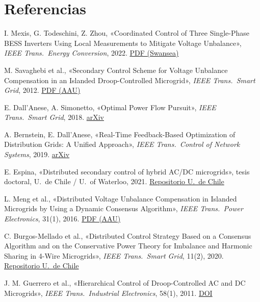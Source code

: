 \documentclass[10pt,a4paper]{article}
\begin{document}
\section{Referencias}
\begin{enumerate}[label={[\arabic*]},leftmargin=*,itemsep=2pt]
  \small
  \item I. Mexis, G. Todeschini, Z. Zhou, «Coordinated Control of Three Single-Phase BESS Inverters Using Local Measurements to Mitigate Voltage Unbalance», \emph{IEEE Trans.\ Energy Conversion}, 2022. \href{https://cronfa.swansea.ac.uk/Record/cronfa61052/Download/61052__25368__35dfd823984a46369995096bae02a94a.pdf}{PDF (Swansea)}
  \item M. Savaghebi et al., «Secondary Control Scheme for Voltage Unbalance Compensation in an Islanded Droop-Controlled Microgrid», \emph{IEEE Trans.\ Smart Grid}, 2012. \href{https://vbn.aau.dk/ws/files/61862782/PREPRINT_secondary_control_scheme_for_voltage_unbalance_compensation.pdf}{PDF (AAU)}
  \item E. Dall'Anese, A. Simonetto, «Optimal Power Flow Pursuit», \emph{IEEE Trans.\ Smart Grid}, 2018. \href{https://arxiv.org/abs/1601.07263}{arXiv}
  \item A. Bernstein, E. Dall'Anese, «Real-Time Feedback-Based Optimization of Distribution Grids: A Unified Approach», \emph{IEEE Trans.\ Control of Network Systems}, 2019. \href{https://arxiv.org/abs/1711.01627}{arXiv}
  \item E. Espina, «Distributed secondary control of hybrid AC/DC microgrids», tesis doctoral, U.\ de Chile / U.\ of Waterloo, 2021. \href{https://repositorio.uchile.cl/handle/2250/182292}{Repositorio U.\ de Chile}
  \item L. Meng et al., «Distributed Voltage Unbalance Compensation in Islanded Microgrids by Using a Dynamic Consensus Algorithm», \emph{IEEE Trans.\ Power Electronics}, 31(1), 2016. \href{https://vbn.aau.dk/ws/files/208630151/trans_manu_doublecol_02242015.pdf}{PDF (AAU)}
  \item C. Burgos-Mellado et al., «Distributed Control Strategy Based on a Consensus Algorithm and on the Conservative Power Theory for Imbalance and Harmonic Sharing in 4-Wire Microgrids», \emph{IEEE Trans.\ Smart Grid}, 11(2), 2020. \href{https://repositorio.uchile.cl/handle/2250/174266}{Repositorio U.\ de Chile}
  \item J. M. Guerrero et al., «Hierarchical Control of Droop-Controlled AC and DC Microgrids», \emph{IEEE Trans.\ Industrial Electronics}, 58(1), 2011. \href{https://doi.org/10.1109/TIE.2010.2066534}{DOI}

\end{enumerate}
\end{document}
